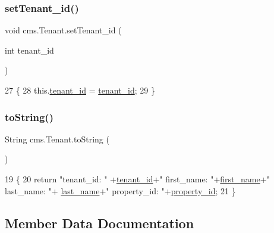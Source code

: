 \subsubsection{\texorpdfstring{set\+Tenant\+\_\+id()}{setTenant\_id()}}
{\footnotesize\ttfamily void cms.\+Tenant.\+set\+Tenant\+\_\+id (\begin{DoxyParamCaption}\item[{int}]{tenant\+\_\+id }\end{DoxyParamCaption})\hspace{0.3cm}{\ttfamily [inline]}}


\begin{DoxyCode}
27                                             \{
28         this.\mbox{\hyperlink{classcms_1_1_tenant_a9f6959947f8d1b98471e00b7952f956e}{tenant\_id}} = \mbox{\hyperlink{classcms_1_1_tenant_a9f6959947f8d1b98471e00b7952f956e}{tenant\_id}};
29     \}
\end{DoxyCode}
\mbox{\label{classcms_1_1_tenant_a67c8a09ed8d9f3d6778485449d80c9cd}} 
\subsubsection{\texorpdfstring{to\+String()}{toString()}}
{\footnotesize\ttfamily String cms.\+Tenant.\+to\+String (\begin{DoxyParamCaption}{ }\end{DoxyParamCaption})\hspace{0.3cm}{\ttfamily [inline]}}


\begin{DoxyCode}
19                             \{
20         \textcolor{keywordflow}{return}  \textcolor{stringliteral}{"tenant\_id: "} +\mbox{\hyperlink{classcms_1_1_tenant_a9f6959947f8d1b98471e00b7952f956e}{tenant\_id}}+\textcolor{stringliteral}{" first\_name: "}+\mbox{\hyperlink{classcms_1_1_tenant_adba73a34c1f9da8843218c5eb247bf65}{first\_name}}+\textcolor{stringliteral}{" last\_name: "}+
      \mbox{\hyperlink{classcms_1_1_tenant_a1f1a39984c6ad7060da79bd6a3ab91ef}{last\_name}}+\textcolor{stringliteral}{" property\_id: "}+\mbox{\hyperlink{classcms_1_1_tenant_a4954483dd78e87b6b4d5e5dac444971e}{property\_id}};
21     \}
\end{DoxyCode}


\subsection{Member Data Documentation}
\mbox{\label{classcms_1_1_tenant_adba73a34c1f9da8843218c5eb247bf65}} 
